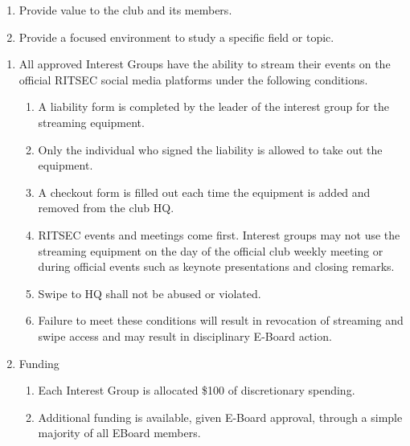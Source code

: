 

\begin{enumerate}
  \item Provide value to the club and its members.
  \item Provide a focused environment to study a specific field or topic.
\end{enumerate}


\begin{enumerate}
  \item All approved Interest Groups have the ability to stream their events on
    the official RITSEC social media platforms under the following conditions.
  \begin{enumerate}
    \item A liability form is completed by the leader of the interest group for
      the streaming equipment.
    \item Only the individual who signed the liability is allowed to take out
      the equipment.
    \item A checkout form is filled out each time the equipment is added and
      removed from the club HQ.
    \item RITSEC events and meetings come first. Interest groups may not use
      the streaming equipment on the day of the official club weekly meeting or
      during official events such as keynote presentations and closing remarks.
    \item Swipe to HQ shall not be abused or violated.
    \item Failure to meet these conditions will result in revocation of
      streaming and swipe access and may result in disciplinary E-Board action.
  \end{enumerate}
  \item Funding
  \begin{enumerate}
    \item Each Interest Group is allocated \$100 of discretionary spending.
    \item Additional funding is available, given E-Board approval, through a
      simple majority of all EBoard members. 
  \end{enumerate}
\end{enumerate}


